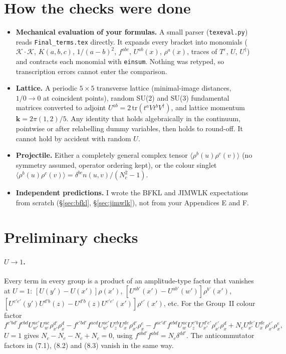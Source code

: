 \documentclass[10pt]{article}
\newcommand{\K}{\mathcal K}
\begin{document}
\section{How the checks were done}
\begin{itemize}
\item \textbf{Mechanical evaluation of your formulas.} A small parser (\texttt{texeval.py}) reads \texttt{Final\_terms.tex} directly. It expands every bracket into monomials ($\K\cdot\K$, $K(a,b,c)$, $1/(a-b)^2$, $f^{abc}$, $U^{ab}(x)$, $\rho^a(x)$, traces of $T^e$, $U$, $U^\dagger$) and contracts each monomial with \texttt{einsum}. Nothing was retyped, so transcription errors cannot enter the comparison.
\item \textbf{Lattice.} A periodic $5\times5$ transverse lattice (minimal-image distances, $1/0\to0$ at coincident points), random SU(2) and SU(3) fundamental matrices converted to adjoint $U^{ab}=2\,\mathrm{tr}(t^aVt^bV^\dagger)$, and lattice momentum $\mathbf k=2\pi(1,2)/5$. Any identity that holds algebraically in the continuum, pointwise or after relabelling dummy variables, then holds to round-off. It cannot hold by accident with random $U$.
\item \textbf{Projectile.} Either a completely general complex tensor $\langle\rho^b(u)\rho^c(v)\rangle$ (no symmetry assumed, operator ordering kept), or the colour singlet $\langle\rho^b(u)\rho^c(v)\rangle=\delta^{bc}n(u,v)/(N_c^2-1)$.
\item \textbf{Independent predictions.} I wrote the BFKL and JIMWLK expectations from scratch (\S\ref{sec:bfkl}, \S\ref{sec:jimwlk}), not from your Appendices E and F.
\end{itemize}

\section{Preliminary checks}\label{sec:prelim}
\paragraph{$U\to1$.} Every term in every group is a product of an amplitude-type factor that vanishes at $U=1$:
$[U(y')-U(x')]\rho(x')$, $[U^{ab'}(x')-U^{ab'}(w')]\rho^{b'}(x')$, $[U^{c'e'}(y')U^{d'b}(z)-U^{d'b}(z)U^{c'e'}(x')]\rho^{e'}(x')$, etc. For the
Group~II colour factor
\[
f^{c'bd'}f^{cbd}U^{ac'}_{w'}U^{ac}_{w}\rho^{d'}_{x'}\rho^{d}_{x}-f^{c'bd'}f^{acd}U^{ac'}_{w'}U^{cb}_{z}U^{de}_{x}\rho^{d'}_{x'}\rho^{e}_{x}
-f^{ac'd'}f^{cbd}U^{ac}_{w}U^{c'b}_{z}U^{d'e'}_{x'}\rho^{e'}_{x'}\rho^{d}_{x}+N_cU^{de'}_{x'}U^{de}_{x}\rho^{e'}_{x'}\rho^{e}_{x},
\]
$U=1$ gives $N_c-N_c-N_c+N_c=0$, using $f^{abd'}f^{abd}=N_c\delta^{dd'}$. The anticommutator factors in (7.1), (8.2) and (8.3) vanish in the same way.
\end{document}
